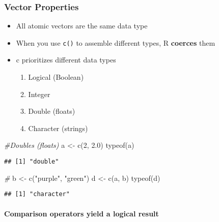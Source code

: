 \documentclass[
]{article}
\newenvironment{Shaded}{\begin{snugshade}}{\end{snugshade}}
\newcommand{\CommentTok}[1]{\textcolor[rgb]{0.56,0.35,0.01}{\textit{#1}}}
\newcommand{\DecValTok}[1]{\textcolor[rgb]{0.00,0.00,0.81}{#1}}
\newcommand{\FloatTok}[1]{\textcolor[rgb]{0.00,0.00,0.81}{#1}}
\newcommand{\FunctionTok}[1]{\textcolor[rgb]{0.00,0.00,0.00}{#1}}
\newcommand{\NormalTok}[1]{#1}
\newcommand{\OtherTok}[1]{\textcolor[rgb]{0.56,0.35,0.01}{#1}}
\newcommand{\StringTok}[1]{\textcolor[rgb]{0.31,0.60,0.02}{#1}}
\providecommand{\tightlist}{%
  \setlength{\itemsep}{0pt}\setlength{\parskip}{0pt}}
\begin{document}
\hypertarget{vector-properties}{%
\subsubsection{Vector Properties}\label{vector-properties}}

\begin{itemize}
\tightlist
\item
  All atomic vectors are the same data type
\item
  When you use \texttt{c()} to assemble different types, R
  \textbf{coerces} them
\item
  c prioritizes different data types

  \begin{enumerate}
  \def\labelenumi{\arabic{enumi}.}
  \tightlist
  \item
    Logical (Boolean)
  \item
    Integer
  \item
    Double (floats)
  \item
    Character (strings)
  \end{enumerate}
\end{itemize}

\begin{Shaded}
\begin{Highlighting}[]
\CommentTok{\#Doubles (floats)}
\NormalTok{a }\OtherTok{\textless{}{-}} \FunctionTok{c}\NormalTok{(}\DecValTok{2}\NormalTok{, }\FloatTok{2.0}\NormalTok{)}
\FunctionTok{typeof}\NormalTok{(a)}
\end{Highlighting}
\end{Shaded}

\begin{verbatim}
## [1] "double"
\end{verbatim}

\begin{Shaded}
\begin{Highlighting}[]
\CommentTok{\#}
\NormalTok{b }\OtherTok{\textless{}{-}} \FunctionTok{c}\NormalTok{(}\StringTok{"purple"}\NormalTok{, }\StringTok{"green"}\NormalTok{)}
\NormalTok{d }\OtherTok{\textless{}{-}} \FunctionTok{c}\NormalTok{(a, b)}
\FunctionTok{typeof}\NormalTok{(d)}
\end{Highlighting}
\end{Shaded}

\begin{verbatim}
## [1] "character"
\end{verbatim}

\hypertarget{comparison-operators-yield-a-logical-result}{%
\paragraph{Comparison operators yield a logical
result}\label{comparison-operators-yield-a-logical-result}}
\end{document}
